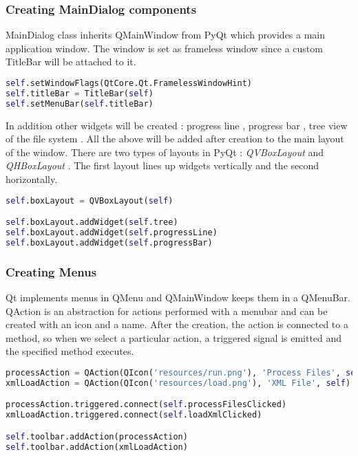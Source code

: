 \subsubsection{Creating MainDialog components}

MainDialog class inherits QMainWindow from PyQt which provides a main application window. The window is set as frameless window since a custom TitleBar will be attached to it. 

\begin{lstlisting}[language=python, caption={Create the title bar for the main window.}]
self.setWindowFlags(QtCore.Qt.FramelessWindowHint)
self.titleBar = TitleBar(self)
self.setMenuBar(self.titleBar)
\end{lstlisting}

In addition other widgets will be created : progress line , progress bar , tree view of the file system . All the above will be added after creation to the main layout of the window. There are two types of layouts in PyQt : \textit{QVBoxLayout} and \textit{QHBoxLayout} . The first layout lines up widgets vertically and the second horizontally.

\begin{lstlisting}[language=python, caption={Add widgets to the main window layout.}]
self.boxLayout = QVBoxLayout(self)

self.boxLayout.addWidget(self.tree)
self.boxLayout.addWidget(self.progressLine)
self.boxLayout.addWidget(self.progressBar)
\end{lstlisting}

\subsubsection{Creating Menus}
Qt implements menus in QMenu and QMainWindow keeps them in a QMenuBar. QAction is an abstraction for actions performed with a menubar and can be created with an icon and a name. After the creation, the action is connected to a method, so when we select a particular action, a triggered signal is emitted and the specified method executes. 

\begin{lstlisting}[language=python, caption={A menu creation with two actions.}]
processAction = QAction(QIcon('resources/run.png'), 'Process Files', self)
xmlLoadAction = QAction(QIcon('resources/load.png'), 'XML File', self)

processAction.triggered.connect(self.processFilesClicked)
xmlLoadAction.triggered.connect(self.loadXmlClicked)

self.toolbar.addAction(processAction)
self.toolbar.addAction(xmlLoadAction)
\end{lstlisting}

